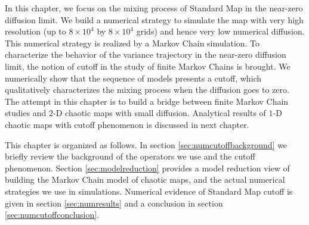 %


In this chapter, we focus on the mixing process of Standard Map in the near-zero diffusion limit. We build a numerical strategy to simulate the map with very high resolution (up to $8 \times 10^4$ by $8 \times 10^4$ grids) and hence very low numerical diffusion. This numerical strategy is realized by a Markov Chain simulation. To characterize the behavior of the variance trajectory in the near-zero diffusion limit, the notion of cutoff in the study of finite Markov Chains is brought. We numerically show that the sequence of models presents a cutoff, which qualitatively characterizes the mixing process when the diffusion goes to zero. The attempt in this chapter is to build a bridge between finite Markov Chain studies and $2$-D chaotic maps with small diffusion. Analytical results of $1$-D chaotic maps with cutoff phenomenon is discussed in next chapter.

This chapter is organized as follows. In section \ref{sec:numcutoffbackground} we briefly review the background of the operators we use and the cutoff phenomenon. Section \ref{sec:modelreduction} provides a model reduction view of building the Markov Chain model of chaotic maps, and the actual numerical strategies we use in simulations. Numerical evidence of Standard Map cutoff is given in section \ref{sec:numresults} and a conclusion in section \ref{sec:numcutoffconclusion}.  


